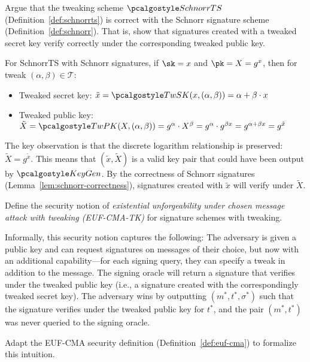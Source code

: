 \begin{exercise}[Optional]
  Argue that the tweaking scheme $\algo{SchnorrTS}$ (Definition~\ref{def:schnorrts}) is correct with the Schnorr signature scheme (Definition~\ref{def:schnorr}).
  That is, show that signatures created with a tweaked secret key verify correctly under the corresponding tweaked public key.
\end{exercise}

\ifsolutions
\begin{mysolution}
  For SchnorrTS with Schnorr signatures, if $\sk = x$ and $\pk = X = g^x$, then for tweak $(\alpha, \beta) \in \mathcal{T}$:
  \begin{itemize}
    \item Tweaked secret key: $\tilde{x} = \algo{TwSK}(x, (\alpha, \beta)) = \alpha + \beta \cdot x$
    \item Tweaked public key: $\tilde{X} = \algo{TwPK}(X, (\alpha, \beta)) = g^\alpha \cdot X^\beta = g^\alpha \cdot g^{\beta x} = g^{\alpha + \beta x} = g^{\tilde{x}}$
  \end{itemize}
  
  The key observation is that the discrete logarithm relationship is preserved: $\tilde{X} = g^{\tilde{x}}$.
  This means that $(\tilde{x}, \tilde{X})$ is a valid key pair that could have been output by $\algo{KeyGen}$.
  By the correctness of Schnorr signatures (Lemma~\ref{lem:schnorr-correctness}), signatures created with $\tilde{x}$ will verify under $\tilde{X}$.
\end{mysolution}
\fi

\begin{exercise}
  Define the security notion of \emph{existential unforgeability under chosen message attack with tweaking (EUF-CMA-TK)} for signature schemes with tweaking.
  
  Informally, this security notion captures the following:
  The adversary is given a public key and can request signatures on messages of their choice, but now with an additional capability---for each signing query, they can specify a tweak in addition to the message.
  The signing oracle will return a signature that verifies under the tweaked public key (i.e., a signature created with the correspondingly tweaked secret key).
  The adversary wins by outputting $(m^*, t^*, \sigma^*)$ such that the signature verifies under the tweaked public key for $t^*$, and the pair $(m^*, t^*)$ was never queried to the signing oracle.
  
  Adapt the EUF-CMA security definition (Definition~\ref{def:euf-cma}) to formalize this intuition.
\end{exercise}


